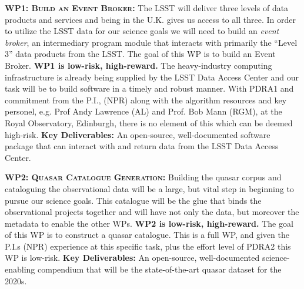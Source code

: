 \documentclass[oneside, a4paper, onecolumn, 11pt]{article}
\begin{document}
\smallskip
\smallskip
\noindent
\textbf{\textsc{WP1: Build an Event Broker:}} 
The LSST will deliver three levels of data products and
services and being in the U.K. gives us access to all three. 
 In order to utilize the LSST data for our science goals we will need to build an {\it event
broker}, an intermediary program module that interacts with primarily
the ``Level 3'' data products from the LSST.
The goal of this WP is to build an Event Broker. 
{\bf WP1 is low-risk, high-reward.} 
The heavy-industry computing infrastructure is already being supplied
by the LSST Data Access Center and our task will be to build software
in a timely and robust manner. With PDRA1 and commitment from the P.I., (NPR) along with the algorithm
resources and key personel, e.g. Prof Andy Lawrence (AL) and Prof. Bob
Mann (RGM), at the Royal Observatory, Edinburgh, there is no element
of this which can be deemed high-risk.  {\bf Key Deliverables:} An
open-source, well-documented software package that can interact with
and return data from the LSST Data Access Center.


\smallskip
\smallskip
\noindent
\textbf{\textsc{WP2: Quasar Catalogue Generation:}} 
Building the quasar corpus and cataloguing the observational data will
be a large, but vital step in beginning to pursue our science
goals. This catalogue will be the glue that binds the observational
projects together and will have not only the data, but moreover the
metadata to enable the other WPs.
{\bf WP2 is low-risk, high-reward.}
The goal of this WP is to construct a quasar catalogue.
This is a full WP, and given the P.I.s (NPR) experience at this
specific task, plus the effort level of PDRA2 this WP is low-risk. 
{\bf Key Deliverables:} An open-source, well-documented science-enabling compendium that
will be the state-of-the-art quasar dataset for the 2020s. 
\end{document}
